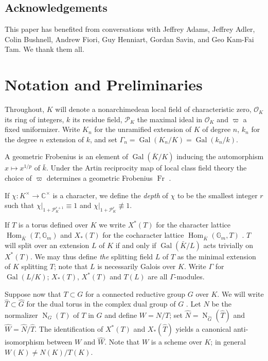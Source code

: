 \documentclass{compositio}
\theoremstyle{plain}
\theoremstyle{definition}
\DeclareMathOperator{\Gal}{Gal}
\DeclareMathOperator{\Hom}{Hom}
\DeclareMathOperator{\Fr}{Fr}
\newcommand{\OK}{\mathcal{O}_K}
\newcommand{\PK}{\mathcal{P}_K}
\newcommand{\Gm}{\mathbb{G}_m}
\newcommand{\Normalizer}[2]{\operatorname{N}_{#2}(#1)}
\begin{document}
\subsection*{Acknowledgements}

This paper has benefited from conversations with Jeffrey Adams, Jeffrey Adler, Colin Bushnell, Andrew Fiori, Guy Henniart, Gordan Savin, and Geo Kam-Fai Tam.  We thank them all.

\section{Notation and Preliminaries} \label{section:notation}

Throughout, $K$ will denote a nonarchimedean local field of
characteristic zero, $\OK$ its ring of integers, $k$ its residue field,
$\PK$ the maximal ideal in $\OK$ and $\varpi$ a fixed uniformizer.
Write $K_n$ for the unramified extension of $K$ of degree $n$, $k_n$ for
the degree $n$ extension of $k$,
and set $\Gamma_n = \Gal(K_n/K) = \Gal(k_n/k)$.

A geometric Frobenius is an element of $\Gal(\bar{K}/K)$
inducing the automorphism $x \mapsto x^{1/p}$ of $\bar{k}$.  Under the
Artin reciprocity map of local class field theory the choice of $\varpi$
determines a geometric Frobenius $\Fr$ \cite[\S 2]{serre:LocalClassFieldThy}.

If $\chi : K^{\times} \rightarrow \mathbb{C}^{\times}$ is a character, we define
the \emph{depth} of $\chi$ to be the smallest integer $r$ such that
$\chi|_{1 + \PK^{r+1}} \equiv 1$ and
$\chi|_{1 + \PK^{r}} \not\equiv 1$.

If $T$ is a torus defined over $K$ we write $X^*(T)$
for the character lattice $\Hom_{\bar{K}}(T, \Gm)$ and $X_*(T)$ for the
cocharacter lattice $\Hom_{\bar{K}}(\Gm, T)$ \cite[\S 16.2]{humphreys:LinAlgGrps}.
$T$ will split over an extension
$L$ of $K$ if and only if $\Gal(\bar{K}/L)$ acts trivially on $X^*(T)$.
We may thus define \emph{the} splitting field $L$ of $T$ as the
minimal extension of $K$ splitting $T$; note that $L$ is necessarily
Galois over $K$.  Write $\Gamma$ for $\Gal(L/K)$; $X_*(T)$, $X^*(T)$ and $T(L)$
are all $\Gamma$-modules.

Suppose now that $T \subset G$ for a connected reductive group $G$ over $K$.
We will write $\hat{T} \subset \hat{G}$ for the dual torus in the complex dual group of $G$ \cite[\S I.2]{borel:79a}.
Let $N$ be the normalizer $\Normalizer{T}{G}$ of $T$ in $G$ and define $W = N/T$;
set $\hat{N} = \Normalizer{\hat{T}}{\hat{G}}$ and
$\hat{W} = \hat{N}/\hat{T}$.  The identification of $X^*(T)$ and $X_*(\hat{T})$
yields a canonical anti-isomorphism between $W$ and $\hat{W}$.
Note that $W$ is a scheme over $K$; in general $W(K) \ne N(K) / T(K)$.
\end{document}

